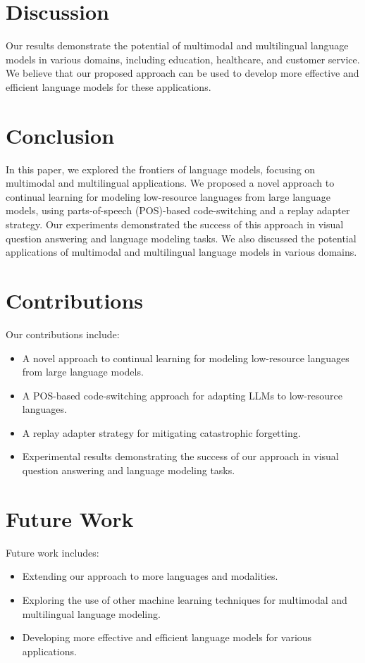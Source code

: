 \documentclass{article}
\begin{document}
\section{Discussion}

Our results demonstrate the potential of multimodal and multilingual language models in various domains, including education, healthcare, and customer service. We believe that our proposed approach can be used to develop more effective and efficient language models for these applications.

\section{Conclusion}

In this paper, we explored the frontiers of language models, focusing on multimodal and multilingual applications. We proposed a novel approach to continual learning for modeling low-resource languages from large language models, using parts-of-speech (POS)-based code-switching and a replay adapter strategy. Our experiments demonstrated the success of this approach in visual question answering and language modeling tasks. We also discussed the potential applications of multimodal and multilingual language models in various domains.

\section{Contributions}

Our contributions include:

\begin{itemize}
\item A novel approach to continual learning for modeling low-resource languages from large language models.
\item A POS-based code-switching approach for adapting LLMs to low-resource languages.
\item A replay adapter strategy for mitigating catastrophic forgetting.
\item Experimental results demonstrating the success of our approach in visual question answering and language modeling tasks.
\end{itemize}

\section{Future Work}

Future work includes:

\begin{itemize}
\item Extending our approach to more languages and modalities.
\item Exploring the use of other machine learning techniques for multimodal and multilingual language modeling.
\item Developing more effective and efficient language models for various applications.
\end{itemize}



\end{document}
